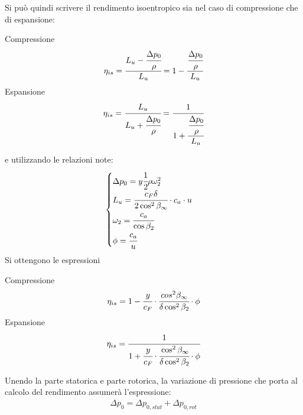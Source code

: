 Si può quindi scrivere il rendimento isoentropico sia nel caso di compressione che di espansione:

\begin{multicols}{2}
Compressione
\begin{align*}
\eta_{is} = \cfrac{L_u - \cfrac{\Delta p_0}{\rho}}{L_u} = 1- \cfrac{\cfrac{\Delta p_0}{\rho}}{L_u}
\end{align*}
\break
Espansione
\begin{align*}
\eta_{is} = \cfrac{L_u}{L_u + \cfrac{\Delta p_0}{\rho}} = \cfrac{1}{1+\cfrac{\cfrac{\Delta p_0}{\rho}}{L_u}}
\end{align*}
\end{multicols}

e utilizzando le relazioni note:
\begin{align*}
\begin{cases}
\Delta p_0 = y \cfrac{1}{2} \rho \omega_2^2\\
L_u = \cfrac{c_F \delta}{2 \cos^2 \beta_{\infty}} \cdot c_a \cdot u\\
\omega_2 = \cfrac{c_a}{\cos \beta_2}\\
\phi = \cfrac{c_a}{u}
\end{cases}
\end{align*}
Si ottengono le espressioni
\begin{multicols}{2}
Compressione
\begin{align*}
\eta_{is} = 1- \cfrac{y}{c_F} \cdot  \cfrac{cos^2 \beta_{\infty}}{\delta \cos^2 \beta_2} \cdot \phi
\end{align*}
\break
Espansione
\begin{align*}
\eta_{is} = \cfrac{1}{1+\cfrac{y}{c_F} \cdot \cfrac{\cos^2 \beta_{\infty}}{\delta \cos^2 \beta_2} \cdot \phi}
\end{align*}
\end{multicols}
Unendo la parte statorica e parte rotorica, la variazione di pressione che porta al calcolo del rendimento assumerà l'espressione:
\begin{align*}
\Delta p_0 = \Delta p_{0,stat} + \Delta p_{0,rot}
\end{align*}

